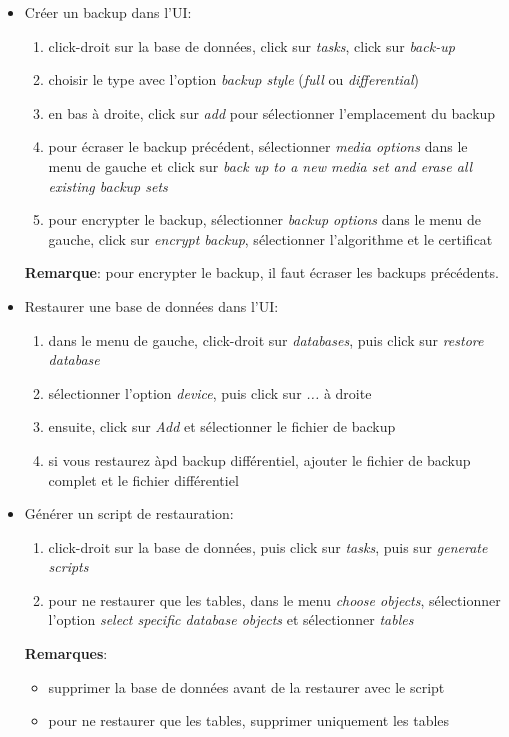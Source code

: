 \documentclass[a4paper]{article}
\begin{document}
\begin{itemize}



\item Créer un backup dans l'UI:
\begin{enumerate}
    \item click-droit sur la base de données, click sur \textit{tasks}, click sur \textit{back-up}
    \item choisir le type avec l'option \textit{backup style} (\textit{full} ou \textit{differential})
    \item en bas à droite, click sur \textit{add} pour sélectionner l'emplacement du backup
    \item pour écraser le backup précédent, sélectionner \textit{media options} dans le menu de gauche et click sur \textit{back up to a new media set and erase all existing backup sets}
    \item pour encrypter le backup, sélectionner \textit{backup options} dans le menu de gauche, click sur \textit{encrypt backup}, sélectionner l'algorithme et le certificat
\end{enumerate}
\textbf{Remarque}: pour encrypter le backup, il faut écraser les backups précédents.



\item Restaurer une base de données dans l'UI:
\begin{enumerate}
    \item dans le menu de gauche, click-droit sur \textit{databases}, puis click sur \textit{restore database}
    \item sélectionner l'option \textit{device}, puis click sur \textit{...} à droite
    \item ensuite, click sur \textit{Add} et sélectionner le fichier de backup
    \item si vous restaurez àpd backup différentiel, ajouter le fichier de backup complet et le fichier différentiel
\end{enumerate}



\item Générer un script de restauration:
\begin{enumerate}
    \item click-droit sur la base de données, puis click sur \textit{tasks}, puis sur \textit{generate scripts}
    \item pour ne restaurer que les tables, dans le menu \textit{choose objects}, sélectionner l'option \textit{select specific database objects} et sélectionner \textit{tables}
\end{enumerate}
\textbf{Remarques}:
\begin{itemize}
    \item supprimer la base de données avant de la restaurer avec le script
    \item pour ne restaurer que les tables, supprimer uniquement les tables
\end{itemize}



\end{itemize}
\end{document}
